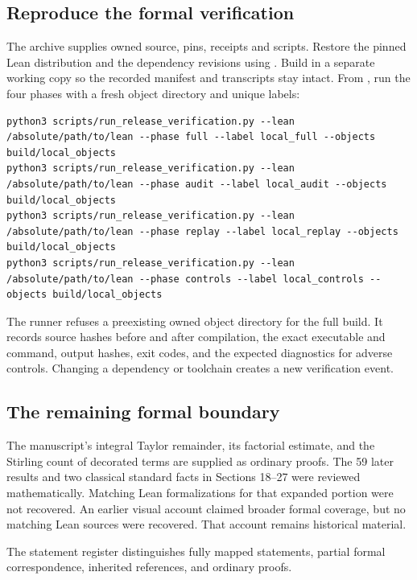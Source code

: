 \subsection*{Reproduce the formal verification}
The archive supplies owned source, pins, receipts and scripts. Restore the pinned Lean distribution and the dependency revisions using . Build in a separate working copy so the recorded manifest and transcripts stay intact. From , run the four phases with a fresh object directory and unique labels:
\begin{Verbatim}[fontsize=\small,frame=leftline,breaklines=true,breakanywhere=true]
python3 scripts/run_release_verification.py --lean /absolute/path/to/lean --phase full --label local_full --objects build/local_objects
python3 scripts/run_release_verification.py --lean /absolute/path/to/lean --phase audit --label local_audit --objects build/local_objects
python3 scripts/run_release_verification.py --lean /absolute/path/to/lean --phase replay --label local_replay --objects build/local_objects
python3 scripts/run_release_verification.py --lean /absolute/path/to/lean --phase controls --label local_controls --objects build/local_objects
\end{Verbatim}
The runner refuses a preexisting owned object directory for the full build. It records source hashes before and after compilation, the exact executable and command, output hashes, exit codes, and the expected diagnostics for adverse controls. Changing a dependency or toolchain creates a new verification event.

\subsection*{The remaining formal boundary}
The manuscript's integral Taylor remainder, its factorial estimate, and the Stirling count of decorated terms are supplied as ordinary proofs. The 59 later results and two classical standard facts in Sections 18--27 were reviewed mathematically. Matching Lean formalizations for that expanded portion were not recovered. An earlier visual account claimed broader formal coverage, but no matching Lean sources were recovered. That account remains historical material.

The statement register distinguishes fully mapped statements, partial formal correspondence, inherited references, and ordinary proofs.
